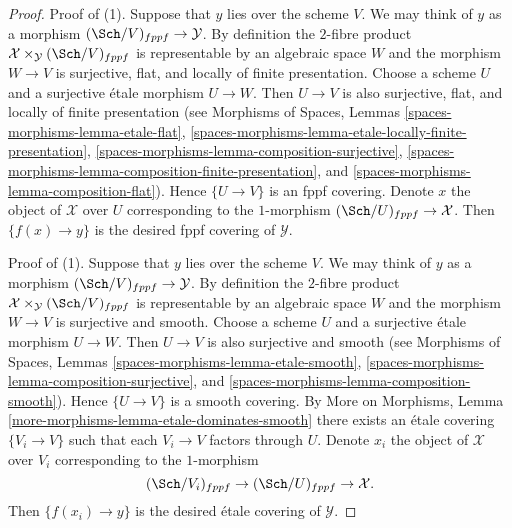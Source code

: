 \begin{proof}
Proof of (1). Suppose that $y$ lies over the scheme $V$.
We may think of $y$ as a morphism $(\Sch/V)_{fppf} \to \mathcal{Y}$.
By definition the $2$-fibre product
$\mathcal{X} \times_\mathcal{Y} (\Sch/V)_{fppf}$
is representable by an algebraic space $W$ and the morphism
$W \to V$ is surjective, flat, and locally of finite presentation.
Choose a scheme $U$ and a surjective \'etale morphism $U \to W$.
Then $U \to V$ is also surjective, flat, and locally of finite presentation
(see Morphisms of Spaces, Lemmas
\ref{spaces-morphisms-lemma-etale-flat},
\ref{spaces-morphisms-lemma-etale-locally-finite-presentation},
\ref{spaces-morphisms-lemma-composition-surjective},
\ref{spaces-morphisms-lemma-composition-finite-presentation}, and
\ref{spaces-morphisms-lemma-composition-flat}).
Hence $\{U \to V\}$ is an fppf covering. Denote $x$ the object of
$\mathcal{X}$ over $U$ corresponding to the $1$-morphism
$(\Sch/U)_{fppf} \to \mathcal{X}$. Then $\{f(x) \to y\}$ is
the desired fppf covering of $\mathcal{Y}$.

\medskip\noindent
Proof of (1). Suppose that $y$ lies over the scheme $V$.
We may think of $y$ as a morphism $(\Sch/V)_{fppf} \to \mathcal{Y}$.
By definition the $2$-fibre product
$\mathcal{X} \times_\mathcal{Y} (\Sch/V)_{fppf}$
is representable by an algebraic space $W$ and the morphism
$W \to V$ is surjective and smooth.
Choose a scheme $U$ and a surjective \'etale morphism $U \to W$.
Then $U \to V$ is also surjective and smooth
(see Morphisms of Spaces, Lemmas
\ref{spaces-morphisms-lemma-etale-smooth},
\ref{spaces-morphisms-lemma-composition-surjective}, and
\ref{spaces-morphisms-lemma-composition-smooth}).
Hence $\{U \to V\}$ is a smooth covering. By
More on Morphisms, Lemma \ref{more-morphisms-lemma-etale-dominates-smooth}
there exists an \'etale covering $\{V_i \to V\}$ such that
each $V_i \to V$ factors through $U$. Denote $x_i$ the object of
$\mathcal{X}$ over $V_i$ corresponding to the $1$-morphism
$$
(\Sch/V_i)_{fppf} \to (\Sch/U)_{fppf} \to \mathcal{X}.
$$
Then $\{f(x_i) \to y\}$ is
the desired \'etale covering of $\mathcal{Y}$.
\end{proof}

